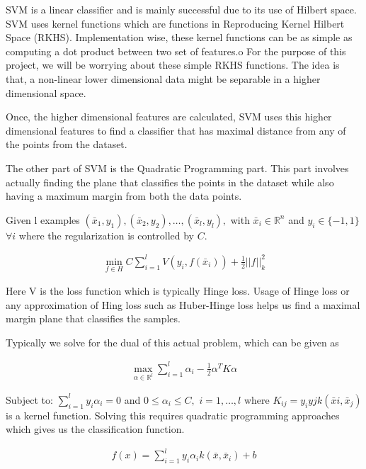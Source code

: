 \documentclass{article}
\begin{document}
SVM is a linear classifier and is mainly successful due to its use of Hilbert space.  
SVM uses kernel functions which are functions in Reproducing Kernel Hilbert Space (RKHS).  
Implementation wise, these kernel functions can be as simple as computing a dot product between two set of features.o
For the purpose of this project, we will be worrying about these simple RKHS functions.
The idea is that, a non-linear lower dimensional data might be separable in a higher dimensional space.

Once, the higher dimensional features are calculated, SVM uses this higher dimensional features to find a classifier that has maximal distance from any of the points from the dataset.  

The other part of SVM is the Quadratic Programming part.  
This part involves actually finding the plane that classifies the points in the dataset while also having a maximum margin from both the data points.

Given l examples $(\bar{x}_{1}, y_{1}), (\bar{x}_{2}, y_{2}), \ldots ,(\bar{x}_{l}, y_{l}), $ with $\bar{x}_{i} \in \mathbb{R}^{n}$ and $y_{i} \in \{-1, 1\} $ $\forall{i} $ where the regularization is controlled by $C$.

\begin{align}
    \min_{f \in H} C\sum_{i = 1}^{l} V(y_{i}, f(\bar{x}_{i})) + \frac{1}{2} {\vert\vert f \vert\vert}_{k}^{2}
\end{align}

Here V is the loss function which is typically Hinge loss.  
Usage of Hinge loss or any approximation of Hing loss such as Huber-Hinge loss helps us find a maximal margin plane that classifies the samples.

Typically we solve for the dual of this actual problem, which can be given as

\begin{align}
    \max_{\alpha \in \mathbb{R}^{l}} \sum_{i = 1}^{l} \alpha_{i} - \frac{1}{2} \alpha^{T}K\alpha
\end{align}

Subject to: $\sum_{i=1}^{l} y_{i}\alpha_{i} = 0$ and $0 \le \alpha_{i} \le C, $ $ i = 1,\ldots,l $ where $K_{ij} = y_{i}y{j}k(\bar{x}{i}, \bar{x}_{j})$ is a kernel function. Solving this requires quadratic programming approaches which gives us the classification function.

\begin{align}
    f(x) = \sum_{i=1}^{l} y_{i}\alpha_{i}k(\bar{x}, \bar{x}_{i}) + b
\end{align}
\end{document}
